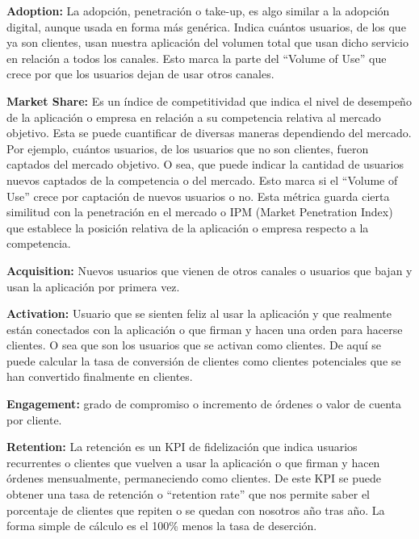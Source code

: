 \begin{description}
  \item {\textbf{Adoption:} La adopción, penetración o take-up, es algo similar a la adopción digital, aunque usada en forma más genérica. Indica cuántos usuarios, de los que ya son clientes, usan nuestra aplicación del volumen total que usan dicho servicio en relación a todos los canales. Esto marca la parte del “Volume of Use” que crece por que los usuarios dejan de usar otros canales.
}

  \item {\textbf{Market Share:} Es un índice de competitividad que indica el nivel de desempeño de la aplicación o empresa en relación a su competencia relativa al mercado objetivo. Esta se puede cuantificar de diversas maneras dependiendo del mercado. Por ejemplo, cuántos usuarios, de los usuarios que no son clientes, fueron captados del mercado objetivo. O sea, que puede indicar la cantidad de usuarios nuevos captados de la competencia o del mercado. Esto marca si el “Volume of Use” crece por captación de nuevos usuarios o no. Esta métrica guarda cierta similitud con la penetración en el mercado o IPM (Market Penetration Index) que establece la posición relativa de la aplicación o empresa respecto a la competencia.
}

  \item {\textbf{Acquisition:} Nuevos usuarios que vienen de otros canales o usuarios que bajan y usan la aplicación por primera vez.
}

  \item {\textbf{Activation:} Usuario que se sienten feliz al usar la aplicación y que realmente están conectados con la aplicación o que firman y hacen una orden para hacerse clientes. O sea que son los usuarios que se activan como clientes. De aquí se puede calcular la tasa de conversión de clientes como clientes potenciales que se han convertido finalmente en clientes.
}

  \item {\textbf{Engagement:} grado de compromiso o incremento de órdenes o valor de cuenta por cliente.
}

  \item {\textbf{Retention:} La retención es un KPI de fidelización que indica usuarios recurrentes o clientes que vuelven a usar la aplicación o que firman y hacen órdenes mensualmente, permaneciendo como clientes. De este KPI se puede obtener una tasa de retención o “retention rate” que nos permite saber el porcentaje de clientes que repiten o se quedan con nosotros año tras año. La forma simple de cálculo es el 100\% menos la tasa de deserción.
}


\end{description}
